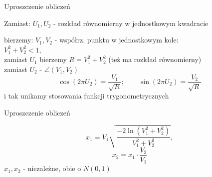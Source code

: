 \begin{frame}{Uproszczenie obliczeń}
	\begin{block}{Zamiast:}
		$U_{1}, U_{2}$ - rozkład równomierny w jednostkowym kwadracie
	\end{block}

	\begin{block}{bierzemy:}
		$V_{1}, V_{2}$ - współrz. punktu w jednostkowym kole:\\
		$V_{1}^{2} + V_{2}^{2} < 1$,\\
		zamiast $U_1$ bierzemy $R = V_{1}^{2} + V_{2}^{2}$ (też ma rozkład równomierny)\\
		zamiast $U_{2}$ - $\angle(V_{1}, V_{2})$ 
		\[
			\cos(2\pi U_{2}) = \frac{V_{1}}{\sqrt{R}}; \qquad \sin(2\pi U_{2}) = \frac{V_{2}}{\sqrt{R}}
		\]
		i tak unikamy stosowania funkcji trygonometrycznych
	\end{block}
\end{frame}
\begin{frame}{Uproszczenie obliczeń}
	\begin{block}{}
		\[
			x_{1} = V_{1}\sqrt{\frac{-2 \ln(V_{1}^{2} + V_{2}^{2})}{V_{1}^{2} + V_{2}^{2}}},
		\]
		\[
			x_{2} = x_{1} \cdot \frac{V_{2}}{V_{1}}
		\]
		$x_{1}, x_{2}$ - niezależne, obie o $N(0,1)$
	\end{block}
\end{frame}